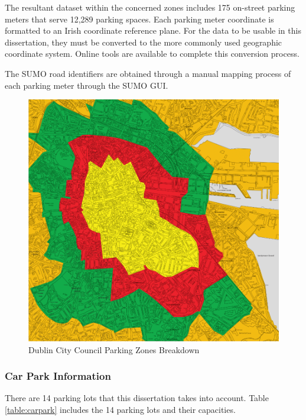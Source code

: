The resultant dataset within the concerned zones includes 175 on-street parking meters that serve 12,289 parking spaces. Each parking meter coordinate is formatted to an Irish coordinate reference plane. For the data to be usable in this dissertation, they must be converted to the more commonly used geographic coordinate system. Online tools are available to complete this conversion process.

The SUMO road identifiers are obtained through a manual mapping process of each parking meter through the SUMO GUI.

\begin{figure}[H]
    \centering
    \includegraphics[width=1\textwidth]{./Images/DUBLINZONES.PNG}
    \caption{Dublin City Council Parking Zones Breakdown}
    \label{fig:DUBLINZONES}
\end{figure}

\pagebreak 

\subsubsection{Car Park Information}\label{ssec:car_par_cap}
There are 14 parking lots that this dissertation takes into account. Table \ref{table:carpark} includes the 14 parking lots and their capacities.

